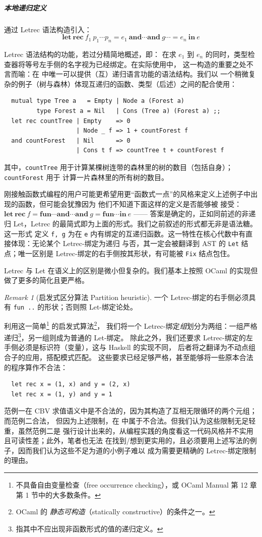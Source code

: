 \documentclass[a4paper, 11pt]{article}
\theoremstyle{remark}\newtheorem*{remark}{Remark}
\theoremstyle{definition}\newtheorem*{definition}{Definition}
\begin{document}
\subparagraph{本地递归定义} 通过 Letrec 语法构造引入：
\[
  \mathbf{let\ rec}\ f_1\ p_1\cdots p_n = e_1\
  \mathbf{and}\cdots \mathbf{and}\ g\cdots = e_n\
  \mathbf{in}\ e
\]

Letrec 语法结构的功能，若过分精简地概述，即：
在求 \(e_1\) 到 \(e_n\) 的同时，类型检查器将等号左手侧的名字视为已经绑定。在实际使用中，
这一构造的重要之处不言而喻：在 \Tigris 中唯一可以提供（互）递归语言功能的语法结构。我们以
一个稍微复杂的例子（树与森林）体现互递归的函数、类型（后述）之间的配合使用：

\begin{verbatim}
  mutual type Tree a   = Empty | Node a (Forest a)
         type Forest a = Nil   | Cons (Tree a) (Forest a) ;;
  let rec countTree | Empty    => 0
                    | Node _ f => 1 + countForest f
  and countForest   | Nil      => 0
                    | Cons t f => countTree t + countForest f
\end{verbatim}

其中，\texttt{countTree} 用于计算某棵树连带的森林里的树的数目（包括自身）；\texttt{countForest} 用于
计算一片森林里的所有树的数目。

刚接触函数式编程的用户可能更希望用更“函数式一点”的风格来定义上述例子中出现的函数，但可能会犹豫因为
他们不知道下面这样的定义是否能够被 \Tigris 接受：
\(\mathbf{let\ rec}\ f = \mathbf{fun}\cdots\mathbf{and}\cdots \mathbf{and}\ g = \mathbf{fun}\cdots
  \mathbf{in}\ e
\) —— 答案是确定的，正如同前述的非递归 Let，Letrec 的最简式即为上面的形式。我们之前叙述的形式都无非是语法糖。这一形式
定义 \texttt{f, g} 为在 \texttt{e} 内有绑定的互递归函数。这一特性在核心代数中有直接体现：无论某个 Letrec-绑定为递归
与否，其一定会被翻译到 AST 的 \texttt{Let} 结点；唯一区别是 Letrec-绑定的右手侧按其形状，有可能被 \texttt{Fix} 结点包住。

Letrec 与 Let 在语义上的区别是微小但复杂的。我们基本上按照 OCaml 的实现但做了更多的简化且更严格。
\begin{remark}[启发式区分算法 Partition heuristic]
  一个 Letrec-绑定的右手侧必须具有 \texttt{fun ..} 的形状；否则照 Let-绑定论处。
\end{remark}
利用这一简单\footnote{
  不具备自由变量检查（free occurrence checking），或 OCaml Manual 第 12 章第 1 节中的大多数条件。
}
的启发式算法\footnote{OCaml 的 \emph{静态可构造}（statically constructive）的条件之一。}，
我们将一个 Letrec-绑定\emph{组}划分为两组：一组严格递归\footnote{
  指其中不应出现非函数形式的值的递归定义。
}，另一组则成为普通的 Let-绑定。
除此之外，我们还要求 Letrec-绑定的左手侧必须是标识符（变量），这与 Haskell 的实现不同，
后者将之翻译为不动点组合子的应用，搭配模式匹配。
这些要求已经足够严格，甚至能够将一些原本合法的程序算作不合法：
\begin{verbatim}
  let rec x = (1, x) and y = (2, x)
  let rec x = (1, y) and y = 1
\end{verbatim}
范例一在 CBV 求值语义中是不合法的，因为其构造了互相无限循环的两个元组；而范例二合法，
但因为上述限制，在 \Tigris 中属于不合法。但我们认为这些限制无足轻重，虽然范例二是
强行设计出来的，从编程实践的角度看这一代码风格并不实用且可读性差；此外，笔者也无法
在找到/想到更实用的，且必须要用上述写法的例子，因而我们认为这些不足为道的小例子难以
成为需要更精确的 Letrec-绑定限制的理由。
\end{document}
